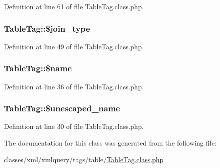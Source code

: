 Definition at line 61 of file Table\-Tag.\-class.\-php.

\hypertarget{classTableTag_ac78ab418306b73bfba9782dcea2b5436}{
\subsubsection[{\$join\-\_\-type}]{\setlength{\rightskip}{0pt plus 5cm}Table\-Tag\-::\$join\-\_\-type}}\label{classTableTag_ac78ab418306b73bfba9782dcea2b5436}


Definition at line 49 of file Table\-Tag.\-class.\-php.

\hypertarget{classTableTag_adab1e27e976c86151cadf9dd315427c7}{
\subsubsection[{\$name}]{\setlength{\rightskip}{0pt plus 5cm}Table\-Tag\-::\$name}}\label{classTableTag_adab1e27e976c86151cadf9dd315427c7}


Definition at line 36 of file Table\-Tag.\-class.\-php.

\hypertarget{classTableTag_aa7fe4c9dfe7ea60993ebaf0bd2f24e56}{
\subsubsection[{\$unescaped\-\_\-name}]{\setlength{\rightskip}{0pt plus 5cm}Table\-Tag\-::\$unescaped\-\_\-name}}\label{classTableTag_aa7fe4c9dfe7ea60993ebaf0bd2f24e56}


Definition at line 30 of file Table\-Tag.\-class.\-php.



The documentation for this class was generated from the following file\-:\begin{DoxyCompactItemize}
\item 
classes/xml/xmlquery/tags/table/\hyperlink{TableTag_8class_8php}{Table\-Tag.\-class.\-php}\end{DoxyCompactItemize}
